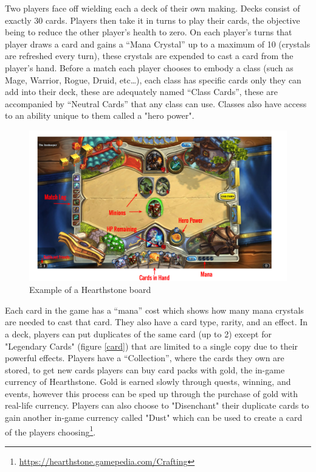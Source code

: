 \documentclass{report} %
\begin{document}
	\indent Two players face off wielding each a deck of their own making. Decks consist of exactly 30 cards. Players then take it in turns to play their cards, the objective being to reduce the other player's health to zero. On each player's turns that player draws a card and gains a “Mana Crystal” up to a maximum of 10 (crystals are refreshed every turn), these crystals are expended to cast a card from the player's hand. Before a match each player chooses to embody a class (such as Mage, Warrior, Rogue, Druid, etc…), each class has specific cards only they can add into their deck, these are adequately named “Class Cards”, these are accompanied by “Neutral Cards” that any class can use. Classes also have access to an ability unique to them called a "hero power". \\
	
\begin{figure}[h]
\centering
\includegraphics[width=1\textwidth]{hearthstonegameboard}
\caption{Example of a Hearthstone board\protect\footnotemark}
 \label{board}
\end{figure}
	
	Each card in the game has a “mana” cost which shows how many mana crystals are needed to cast that card. They also have a card type, rarity, and an effect. In a deck, players can put duplicates of the same card (up to 2) except for "Legendary Cards" (figure \ref{card}) that are limited to a single copy due to their powerful effects.  Players have a “Collection”, where the cards they own are stored, to get new cards players can buy card packs with gold, the in-game currency of Hearthstone. Gold is earned slowly through quests, winning, and events, however this process can be sped up through the purchase of gold with real-life currency. Players can also choose to "Disenchant" their duplicate cards to gain another in-game currency called "Dust" which can be used to create a card of the players choosing\footnote{\url{https://hearthstone.gamepedia.com/Crafting}}.
\end{document}
